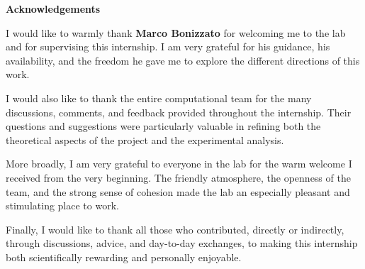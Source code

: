 
\newpage
\thispagestyle{empty}
\vspace*{2cm}

\begin{center}
  {\LARGE\bfseries Acknowledgements}
\end{center}

\vspace{1.2cm}

\noindent
I would like to warmly thank \textbf{Marco Bonizzato} for welcoming me to the lab
and for supervising this internship. I am very grateful for his guidance, his
availability, and the freedom he gave me to explore the different directions of
this work.

\vspace{0.2cm}

\noindent
I would also like to thank the entire computational team for the many discussions,
comments, and feedback provided throughout the internship. Their questions and
suggestions were particularly valuable in refining both the theoretical aspects
of the project and the experimental analysis.

\vspace{0.2cm}

\noindent
More broadly, I am very grateful to everyone in the lab for the warm welcome I
received from the very beginning. The friendly atmosphere, the openness of the
team, and the strong sense of cohesion made the lab an especially pleasant and
stimulating place to work.

\vspace{0.2cm}

\noindent
Finally, I would like to thank all those who contributed, directly or indirectly,
through discussions, advice, and day-to-day exchanges, to making this internship
both scientifically rewarding and personally enjoyable.

\newpage
